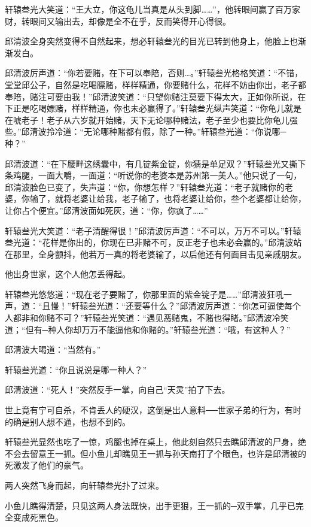 \documentclass[12pt,oneside]{book}
\begin{document}
轩辕叁光大笑道：``王大立，你这龟儿当真是从头到脚\ldots\ldots{}''，他转眼间赢了百万家财，转眼间又输出去，却像是全不在乎，反而笑得开心得很。

邱清波全身突然变得不自然起来，想必轩辕叁光的目光已转到他身上，他脸上也渐渐发白。

邱清波厉声道：``你若要赌，在下可以奉陪，否则\ldots。''轩辕叁光格格笑道：``不错，堂堂邱公子，自然是吃喝膘赌，样样精通，你要赌什么，花样不妨由你出，老子都奉陪，赌注可要由我！''邱清波笑道：``只望你赌注莫要下得太大，正如你所说，在下正是吃喝嫖赌，样样精通，你也未必赢得了。''轩辕叁光纵声笑道：``你龟儿就是在唬老子！老子从六岁就开始赌，天下无论哪种赌法，老子至少也要比你龟儿强些。''邱清波拎冷道：``无论哪种赌都有假，除了一种。''轩辕叁光道：``你说哪─种？''

邱清波道：``在下腰畔这绣囊中，有几锭紫金锭，你猜是单足双？''轩辕叁光又撕下条鸡腿，一面大嚼，一面道：``听说你的老婆本是苏州第一美人。''他只说了一句，邱清波脸色已变了，失声道：``你，你想怎样？''轩辕叁光道：``老子就赌你的老婆，你输了，就将老婆让给我，老子输了，也将老婆让给你，叁个老婆都让给你，让你占个便宜。''邱清波面如死灰，道：``你，你疯了\ldots\ldots{}''

轩辕叁光大笑道：``老子清醒得很！''邱清波厉声道：``不可以，万万不可以。''轩辕叁光道：``花样是你出的，你现在已非赌不可，反正老子也未必会赢的。''邱清波站在那里，全身颤抖，他若万一真的将老婆输了，以后他还有何面目击见亲戚朋友。

他出身世家，这个人他怎丢得起。

轩辕叁光悠悠道：``现在老子要赌了，你那里面的紫金锭子是\ldots\ldots{}''邱清波狂吼一声，道：``且慢！''轩辕叁光道：``还要等什么？''邱清波厉声道：``你怎可逼使每个人都非和你赌不可？''轩辕叁光笑道：``遇见恶赌鬼，不赌也得睹。''邱清波冷笑道；``但有─种人你却万万不能逼他和你赌的。''轩辕叁光道：``哦，有这种人？''

邱清波大喝道：``当然有。''

轩辕叁光道：``你且说说是哪一种人？''

邱清波道：``死人！''突然反手一掌，向自己``天灵''拍了下去。

世上竟有宁可自杀，不肯丢人的硬汉，这倒是出人意料──世家子弟的行为，有时的确是别人想不通，也想不到的。

轩辕叁光显然也吃了一惊，鸡腿也掉在桌上，他此刻自然只去瞧邱清波的尸身，绝不会去留意王一抓。但小鱼儿却瞧见王一抓与孙天南打了个眼色，也许是邱清被的死激发了他们的豪气。

两人突然飞身而起，向轩辕叁光扑了过来。

小鱼儿瞧得清楚，只见这两人身法既快，出手更狠，王一抓的─双手掌，几乎已完全变成死黑色。
\end{document}
